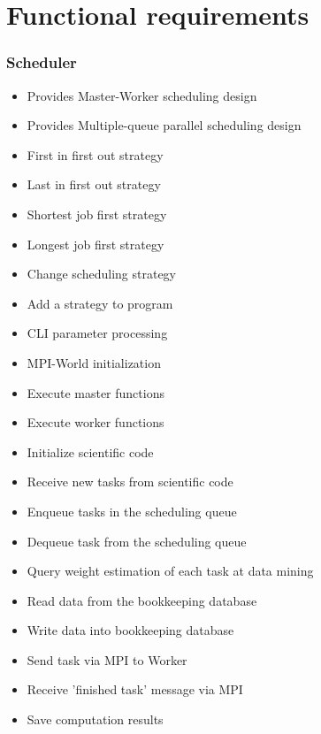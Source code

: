 {


\setcounter{func}{10}
\renewcommand{\labelitemi}{
	\ifnum \value{func}<10$/F 0\arabic{func} /$\addtocounter{func}{10}
	\else $/F \arabic{func} /$\addtocounter{func}{10}\fi
	}

\section{Functional requirements} 
	
	\subsubsection{Scheduler}
	
		\begin{itemize}
			\item Provides Master-Worker scheduling design 
			\item Provides Multiple-queue parallel scheduling design
			\item First in first out strategy
			\item Last in first out strategy
			\item Shortest job first strategy
			\item Longest job first strategy 
			\item Change scheduling strategy
			\item Add a strategy to program
			\item CLI parameter processing
			\item MPI-World initialization
			\item Execute master functions
			\item Execute worker functions
			\item Initialize scientific code
			\item Receive new tasks from scientific code
			\item Enqueue tasks in the scheduling queue
			\item Dequeue task from the scheduling queue
			\item Query weight estimation of each task at data mining
			\item Read data from the bookkeeping database
			\item Write data into bookkeeping database
			\item Send task via MPI to Worker
			\item Receive 'finished task' message via MPI  
			\item Save computation results
		\end{itemize}
	
}
